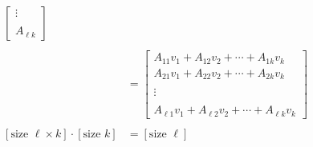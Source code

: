 \begin{align}
\begin{bmatrix}
        \vdots \\\\
        A_{\ell k}
      \end{bmatrix}
      \\\nonumber\\\nonumber
      &=
      \begin{bmatrix}
        A_{11} v_1  + A_{12} v_2 + \cdots + A_{1k} v_k \\
        A_{21} v_1 + A_{22} v_2 + \cdots + A_{2k} v_k \\\\
        \vdots \\\\
        A_{\ell 1} v_1 + A_{\ell 2} v_2+ \cdots + A_{\ell k} v_k
      \end{bmatrix}\\\nonumber\\
      \nonumber
      \left[\mbox{size }\ell \times k \right]
      \cdot \left[\mbox{size } k \right]
      &=
      \left[\mbox{size } \ell \right] \\\nonumber
  \end{align}


